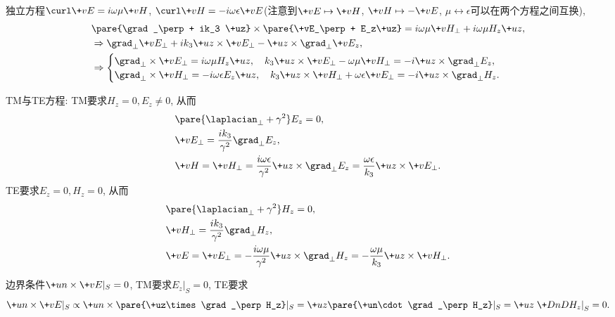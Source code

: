 \documentclass[hidelinks]{ctexart}
\begin{document}
\begin{cenum}
    \item 独立方程$\curl \+vE = i\omega\mu \+vH$, $\curl \+vH = -i\omega\epsilon \+vE$(注意到$\+vE\mapsto \+vH$, $\+vH\mapsto -\+vE$, $\mu \leftrightarrow \epsilon$可以在两个方程之间互换),
    \begin{align*}
        & \pare{\grad_\perp + ik_3 \+uz}\times\pare{\+vE_\perp + E_z\+uz} = i\omega\mu \+vH_\perp + i\omega\mu H_z \+uz, \\
        & \Rightarrow \grad_\perp \+vE_\perp + ik_3 \+uz\times \+vE_\perp - \+uz\times \grad_\perp \+vE_z, \\
        & \Rightarrow \begin{cases}
            \grad_\perp \times \+vE_\perp = i\omega\mu H_z\+uz,\quad k_3\+uz\times \+vE_\perp - \omega\mu \+vH_\perp = -i\+uz\times \grad_\perp E_z, \\
            \grad_\perp \times \+vH_\perp = -i\omega\epsilon E_z \+uz,\quad k_3 \+uz\times \+vH_\perp + \omega\epsilon \+vE_\perp = -i\+uz\times \grad_\perp H_z.
        \end{cases}
    \end{align*}
    \item TM与TE方程: TM要求$H_z = 0, E_z \neq 0$, 从而
    \begin{align*}
        & \pare{\laplacian_\perp + \gamma^2} E_z = 0, \\
        & \+vE_\perp = \frac{ik_3}{\gamma^2}\grad_\perp E_z, \\
        & \+vH = \+vH_\perp = \frac{i\omega\epsilon}{\gamma^2}\+uz\times \grad_\perp E_z = \frac{\omega\epsilon}{k_3} \+uz\times \+vE_\perp.
    \end{align*}
    TE要求$E_z = 0, H_z = 0$, 从而
    \begin{align*}
        & \pare{\laplacian_\perp + \gamma^2}H_z = 0, \\
        & \+vH_\perp = \frac{ik_3}{\gamma^2}\grad_\perp H_z, \\
        & \+vE = \+vE_\perp = -\frac{i\omega\mu}{\gamma^2}\+uz\times \grad_\perp H_z = -\frac{\omega\mu}{k_3}\+uz\times \+vH_\perp.
    \end{align*}
    \item 边界条件$\+un\times \+vE\vert_S = 0$, TM要求$E_z\vert_S = 0$, TE要求
    \[ \+un\times \+vE\vert_S \propto \+un\times\pare{\+uz\times \grad_\perp H_z}\vert_S = \+uz\pare{\+un\cdot \grad_\perp H_z}\vert_S = \+uz \left.\+DnD{H_z}\right\vert_S = 0. \]
\end{cenum}
\end{document}
